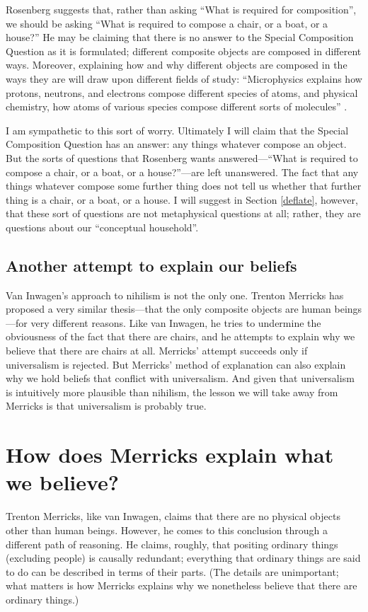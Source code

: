 \documentclass[12pt,twoside]{reedfancy}
\begin{document}
\begin{spacing}{1.25}
Rosenberg suggests that, rather than asking ``What is required for
composition'', we should be asking ``What is required to compose a
chair, or a boat, or a house?''  He may be claiming that there is no
answer to the Special Composition Question as it is formulated;
different composite objects are composed in different ways.  Moreover,
explaining how and why different objects are composed in the ways they
are will draw upon different fields of study: ``Microphysics explains
how protons, neutrons, and electrons compose different species of
atoms, and physical chemistry, how atoms of various species compose
different sorts of molecules'' \citep[706]{rosenberg1993}.

I am sympathetic to this sort of worry.  Ultimately I will claim that
the Special Composition Question has an answer: any things whatever
compose an object.  But the sorts of questions that Rosenberg wants
answered---``What is required to compose a chair, or a boat, or a
house?''---are left unanswered.  The fact that any things whatever
compose some further thing does not tell us whether that further thing
is a chair, or a boat, or a house.  I will suggest in Section
\ref{deflate}, however, that these sort of questions are not
metaphysical questions at all; rather, they are questions about our
``conceptual household''.

\subsection{Another attempt to explain our beliefs}
\label{explain-merricks}
Van Inwagen's approach to nihilism is not the only one.  Trenton
Merricks has proposed a very similar thesis---that the only composite
objects are human beings---for very different reasons.  Like van
Inwagen, he tries to undermine the obviousness of the fact that there
are chairs, and he attempts to explain why we believe that there are
chairs at all.  Merricks' attempt succeeds only if universalism is
rejected.  But Merricks' method of explanation can also explain why we
hold beliefs that conflict with universalism.  And given that
universalism is intuitively more plausible than nihilism, the lesson
we will take away from Merricks is that universalism is probably true.

\section{How does Merricks explain what we believe?}
\label{universe}
\label{merricks}
Trenton Merricks, like van Inwagen, claims that there are no physical
objects other than human beings.  However, he comes to this conclusion
through a different path of reasoning.  He claims, roughly, that
positing ordinary things (excluding people) is causally redundant;
everything that ordinary things are said to do can be described in
terms of their parts. (The details are unimportant; what matters is
how Merricks explains why we nonetheless believe that there are
ordinary things.)


\end{spacing}
\end{document}
